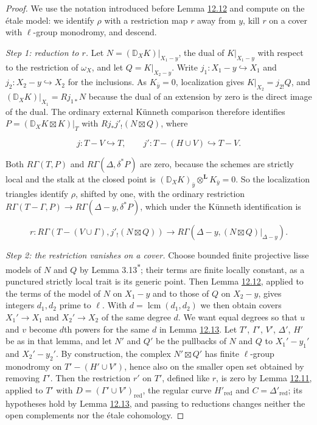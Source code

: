 \documentclass[11pt]{article}
\newcommand{\bpout}[1]{#1\textsuperscript{\hyperlink{bp-outside}{\ensuremath{\ast}}}}
\begin{document}
\begin{proof}[{Proof}]\label{bp271}%
We use the notation introduced before Lemma \hyperref[bp263]{12.12} and compute on the étale model: we identify \(\rho\) with a restriction map \(r\) away from \(y\), kill \(r\) on a cover with \(\ell\)-group monodromy, and descend.

\emph{Step 1: reduction to \(r\).} Let \(N=(\mathbb D_XK)|_{X_1-y}\), the dual of \(K|_{X_1-y}\) with respect to the restriction of \(\omega_X\), and let \(Q=K|_{X_2-y}\). Write \(j_1:X_1-y\hookrightarrow X_1\) and \(j_2:X_2-y\hookrightarrow X_2\) for the inclusions. As \(K_{\bar y}=0\), localization gives \(K|_{X_2}=j_{2!}Q\), and \((\mathbb D_XK)|_{X_1}=Rj_{1*}N\) because the dual of an extension by zero is the direct image of the dual. The ordinary external Künneth comparison therefore identifies \(P=(\mathbb D_XK\boxtimes K)|_T\) with \(Rj_*j'_!(N\boxtimes Q)\), where

\[
j:T-V\hookrightarrow T,\qquad
j':T-(H\cup V)\hookrightarrow T-V.
\]

Both \(R\Gamma(T,P)\) and \(R\Gamma(\Delta,\delta^*P)\) are zero, because the schemes are strictly local and the stalk at the closed point is \((\mathbb D_XK)_{\bar y}\otimes^{\mathbf L} K_{\bar y}=0\). So the localization triangles identify \(\rho\), shifted by one, with the ordinary restriction \(R\Gamma(T-\Gamma,P)\to R\Gamma(\Delta-y,\delta^*P)\), which under the Künneth identification is

\[
r:R\Gamma(T-(V\cup\Gamma),j'_!(N\boxtimes Q))
\longrightarrow R\Gamma(\Delta-y,(N\boxtimes Q)|_{\Delta-y}).
\]

\emph{Step 2: the restriction vanishes on a cover.} Choose bounded finite projective lisse models of \(N\) and \(Q\) by Lemma \bpout{3.13}; their terms are finite locally constant, as a punctured strictly local trait is its generic point. Then Lemma \hyperref[bp263]{12.12}, applied to the terms of the model of \(N\) on \(X_1-y\) and to those of \(Q\) on \(X_2-y\), gives integers \(d_1,d_2\) prime to \(\ell\). With \(d=\operatorname{lcm}(d_1,d_2)\) we then obtain covers \(X_1'\to X_1\) and \(X_2'\to X_2\) of the same degree \(d\). We want equal degrees so that \(u\) and \(v\) become \(d\)th powers for the same \(d\) in Lemma \hyperref[bp265]{12.13}. Let \(T'\), \(\Gamma'\), \(V'\), \(\Delta'\), \(H'\) be as in that lemma, and let \(N'\) and \(Q'\) be the pullbacks of \(N\) and \(Q\) to \(X_1'-y_1'\) and \(X_2'-y_2'\). By construction, the complex \(N'\boxtimes Q'\) has finite \(\ell\)-group monodromy on \(T'-(H'\cup V')\), hence also on the smaller open set obtained by removing \(\Gamma'\). Then the restriction \(r'\) on \(T'\), defined like \(r\), is zero by Lemma \hyperref[bp259]{12.11}, applied to \(T'\) with \(D=(\Gamma'\cup V')_{\mathrm{red}}\), the regular curve \(H'_{\mathrm{red}}\) and \(C=\Delta'_{\mathrm{red}}\); its hypotheses hold by Lemma \hyperref[bp265]{12.13}, and passing to reductions changes neither the open complements nor the étale cohomology.


\end{proof}
\end{document}
